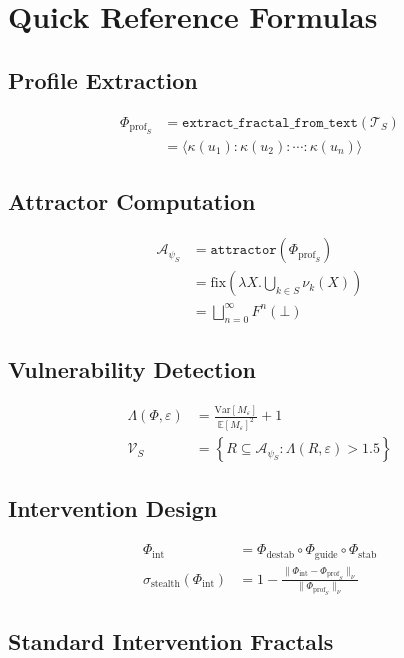\documentclass[11pt,twoside]{book}
\newcommand{\noe}[1]{\nu_{#1}}
\newcommand{\Frac}{\Phi}
\newcommand{\fix}{\mathrm{fix}}
\newcommand{\Lacunarity}{\Lambda}
\newcommand{\PsychAttractor}{\mathcal{A}_\psi}
\newcommand{\ManipFrac}{\Phi_{\mathrm{int}}}
\newcommand{\ProfileFrac}{\Phi_{\mathrm{prof}}}
\newcommand{\VulnSet}{\mathcal{V}}
\newcommand{\StealthFactor}{\sigma_{\mathrm{stealth}}}
\newcommand{\TextCorpus}{\mathcal{T}}
\begin{document}
\chapter{Quick Reference Formulas}
\label{app:quick-ref}

\section{Profile Extraction}
\begin{align}
    \ProfileFrac_S &= \texttt{extract\_fractal\_from\_text}(\TextCorpus_S) \\
    &= \langle \kappa(u_1) : \kappa(u_2) : \cdots : \kappa(u_n) \rangle
\end{align}

\section{Attractor Computation}
\begin{align}
    \PsychAttractor_S &= \texttt{attractor}(\ProfileFrac_S) \\
    &= \fix\left(\lambda X. \bigcup_{k \in S} \noe{k}(X)\right) \\
    &= \bigsqcup_{n=0}^{\infty} F^n(\bot)
\end{align}

\section{Vulnerability Detection}
\begin{align}
    \Lacunarity(\Frac, \varepsilon) &= \frac{\mathrm{Var}[M_\varepsilon]}{\mathbb{E}[M_\varepsilon]^2} + 1 \\
    \VulnSet_S &= \left\{ R \subseteq \PsychAttractor_S : \Lacunarity(R, \varepsilon) > 1.5 \right\}
\end{align}

\section{Intervention Design}
\begin{align}
    \ManipFrac &= \Frac_{\mathrm{destab}} \circ \Frac_{\mathrm{guide}} \circ \Frac_{\mathrm{stab}} \\
    \StealthFactor(\ManipFrac) &= 1 - \frac{\|\ManipFrac - \ProfileFrac_S\|_\nu}{\|\ProfileFrac_S\|_\nu}
\end{align}

\section{Standard Intervention Fractals}
\end{document}
